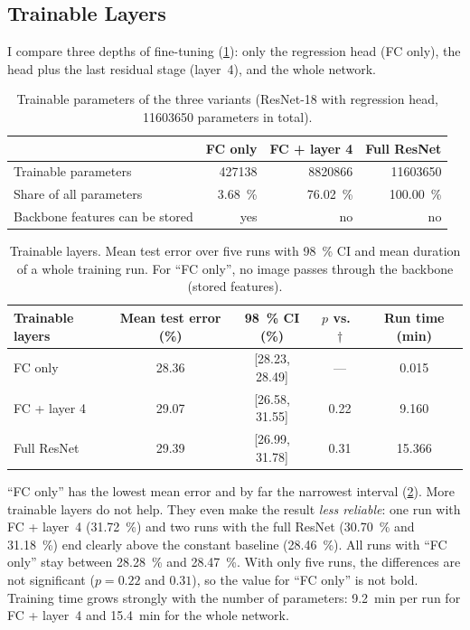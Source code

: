 \subsection{Trainable Layers}
\label{sec:layers}

I compare three depths of fine-tuning (\cref{tab:params}): only the regression
head (FC only), the head plus the last residual stage (layer~4), and the
whole network.

\begin{table}[htbp]
  \centering
  \caption{Trainable parameters of the three variants (ResNet-18 with
           regression head, \num{11603650} parameters in total).}
  \label{tab:params}
  \small
  \begin{tabular}{lrrr}
    \toprule
    & FC only & FC + layer 4 & Full ResNet \\
    \midrule
    Trainable parameters           & \num{427138} & \num{8820866} & \num{11603650} \\
    Share of all parameters        & \SI{3.68}{\percent} & \SI{76.02}{\percent} & \SI{100.00}{\percent} \\
    Backbone features can be stored & yes & no & no \\
    \bottomrule
  \end{tabular}
\end{table}

\begin{table}[htbp]
  \centering
  \caption[Trainable layers]{Trainable layers. Mean test error over five runs with
           \SI{98}{\percent} CI and mean duration of a whole training run. For
           \enquote{FC only}, no image passes through the backbone (stored
           features).}
  \label{tab:layers}
  \small
  \begin{tabular}{lcccc}
    \toprule
    Trainable layers & Mean test error (\%) & \SI{98}{\percent} CI (\%) & $p$ vs.\ $\dagger$ & Run time (min) \\
    \midrule
    FC only\sel{}          & 28.36 & [28.23, 28.49] & ---  & 0.015 \\
    FC + layer 4           & 29.07 & [26.58, 31.55] & 0.22 & 9.160 \\
    Full ResNet            & 29.39 & [26.99, 31.78] & 0.31 & 15.366 \\
    \bottomrule
  \end{tabular}
\end{table}

\enquote{FC only} has the lowest mean error and by far the narrowest interval
(\cref{tab:layers}). More trainable layers do not help. They even make the
result \emph{less reliable}: one run with FC + layer~4 (\SI{31.72}{\percent})
and two runs with the full ResNet (\SI{30.70}{\percent} and
\SI{31.18}{\percent}) end clearly above the constant baseline
(\SI{28.46}{\percent}). All runs with \enquote{FC only} stay between
\SI{28.28}{\percent} and \SI{28.47}{\percent}. With only five runs, the
differences are not significant ($p=0.22$ and $0.31$), so the value for
\enquote{FC only} is not bold. Training time grows strongly with the number of
parameters: \SI{9.2}{\minute} per run for FC + layer~4 and \SI{15.4}{\minute}
for the whole network.

